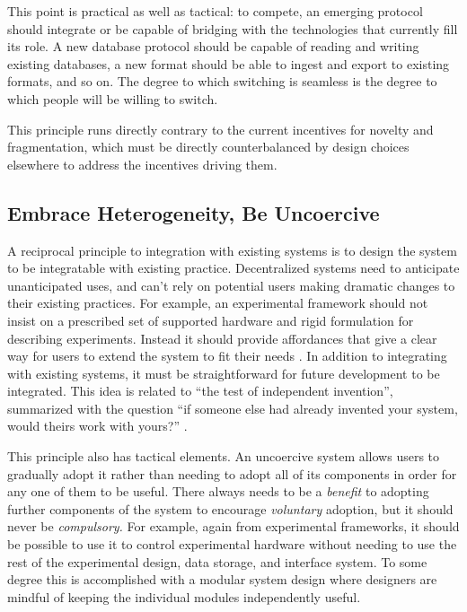 \documentclass[10pt]{tufte-book}
\begin{document}
This point is practical as well as tactical: to compete, an emerging
protocol should integrate or be capable of bridging with the
technologies that currently fill its role. A new database protocol
should be capable of reading and writing existing databases, a new
format should be able to ingest and export to existing formats, and so
on. The degree to which switching is seamless is the degree to which
people will be willing to switch.

This principle runs directly contrary to the current incentives for
novelty and fragmentation, which must be directly counterbalanced by
design choices elsewhere to address the incentives driving them.


\subsection{Embrace Heterogeneity, Be
Uncoercive}

A reciprocal principle to integration with existing systems is to design
the system to be integratable with existing practice. Decentralized
systems need to anticipate unanticipated uses, and can't rely on
potential users making dramatic changes to their existing practices. For
example, an experimental framework should not insist on a prescribed set
of supported hardware and rigid formulation for describing experiments.
Instead it should provide affordances that give a clear way for users to
extend the system to fit their needs \citep{carpenterRFC1958Architectural1996} . In addition to integrating with
existing systems, it must be straightforward for future development to
be integrated. This idea is related to ``the test of independent
invention'', summarized with the question ``if someone else had already
invented your system, would theirs work with yours?'' \citep{berners-leePrinciplesDesign1998} .

This principle also has tactical elements. An uncoercive system allows
users to gradually adopt it rather than needing to adopt all of its
components in order for any one of them to be useful. There always needs
to be a \emph{benefit} to adopting further components of the system to
encourage \emph{voluntary} adoption, but it should never be
\emph{compulsory.} For example, again from experimental frameworks, it
should be possible to use it to control experimental hardware without
needing to use the rest of the experimental design, data storage, and
interface system. To some degree this is accomplished with a modular
system design where designers are mindful of keeping the individual
modules independently useful.
\end{document}

